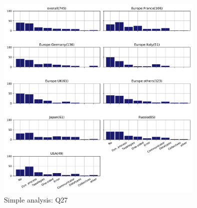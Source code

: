 \begin{figure}[htb]
\begin{center}
\includegraphics[width=10cm]{../pdfs/Q27.pdf}
\caption{Simple analysis: Q27}
\label{fig:Q27}
\end{center}
\end{figure}
